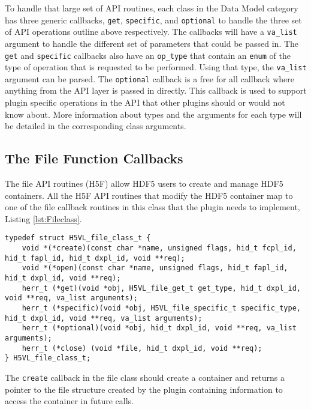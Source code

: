 To handle that large set of API routines, each class in the Data Model category has three generic callbacks, \texttt{get}, \texttt{specific}, and \texttt{optional} to handle the three set of API operations outline above respectively. The callbacks will have a \texttt{va\_list} argument to handle the different set of parameters that could be passed in.  The \texttt{get} and \texttt{specific} callbacks also have an \texttt{op\_type} that contain an \texttt{enum} of the type of operation that is requested to be performed. Using that type, the \texttt{va\_list} argument can be parsed. The \texttt{optional} callback is a free for all callback where anything from the API layer is passed in directly. This callback is used to support plugin specific operations in the API that other plugins should or would not know about. More information about types and the arguments for each type will be detailed in the corresponding class arguments.

\subsection{The File Function Callbacks}
The file API routines (H5F) allow HDF5 users to create and manage HDF5
containers. All the H5F API routines that modify the HDF5 container
map to one of the file callback routines in this class that the plugin
needs to implement, Listing \ref{lst:Fileclass}.

\begin{lstlisting}[caption={File class for file API routines, H5VLpublic.h}, captionpos=b, label={lst:Fileclass}]
typedef struct H5VL_file_class_t {
    void *(*create)(const char *name, unsigned flags, hid_t fcpl_id, hid_t fapl_id, hid_t dxpl_id, void **req);
    void *(*open)(const char *name, unsigned flags, hid_t fapl_id, hid_t dxpl_id, void **req);
    herr_t (*get)(void *obj, H5VL_file_get_t get_type, hid_t dxpl_id, void **req, va_list arguments);
    herr_t (*specific)(void *obj, H5VL_file_specific_t specific_type, hid_t dxpl_id, void **req, va_list arguments);
    herr_t (*optional)(void *obj, hid_t dxpl_id, void **req, va_list arguments);
    herr_t (*close) (void *file, hid_t dxpl_id, void **req);
} H5VL_file_class_t;
\end{lstlisting}

The \texttt{create} callback in the file class should create a container
and returns a pointer to the file structure created by the plugin containing information to
access the container in future calls.\medskip

